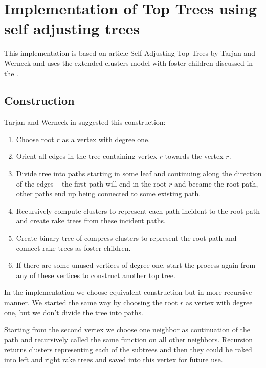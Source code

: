 \chapter{Implementation of Top Trees using self adjusting trees}
\label{chap:ImplementationSelfAdjusting}

This implementation is based on article {\I Self-Adjusting Top Trees}
\cite{SelfAdjustingTT} by Tarjan and Werneck and uses the extended clusters
model with foster children discussed in the .

\section{Construction}

Tarjan and Werneck in \cite{SelfAdjustingTT} suggested this construction:
\begin{enumerate}
\item Choose root $r$ as a vertex with degree one.
\item Orient all edges in the tree containing vertex $r$ towards the vertex $r$.
\item Divide tree into paths starting in some leaf and continuing along the
direction of the edges -- the first path will end in the root $r$ and became the
{\I root path}, other paths end up being connected to some existing path.
\item Recursively compute clusters to represent each path incident to the
root path and create {\I rake trees} from these incident paths.
\item Create binary tree of compress clusters to represent the root path and
connect rake trees as foster children.
\item If there are some unused vertices of degree one, start the process again
from any of these vertices to construct another top tree.
\end{enumerate}

In the implementation we choose equivalent construction but in more recursive
manner. We started the same way by choosing the root $r$ as vertex with degree
one, but we don't divide the tree into paths.

Starting from the second vertex we choose one neighbor as continuation of the
path and recursively called the same function on all other neighbors. Recursion
returns clusters representing each of the subtrees and then they could be
raked into left and right rake trees and saved into this vertex for future use.

